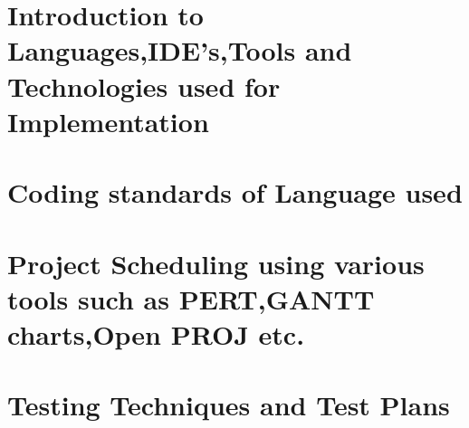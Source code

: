 	\section{Introduction to Languages,IDE’s,Tools and Technologies used for Implementation
}
	\section{Coding standards of Language used 
}
	\section{Project Scheduling using various tools such as PERT,GANTT charts,Open PROJ etc.
}
	\section{Testing Techniques and Test Plans
}